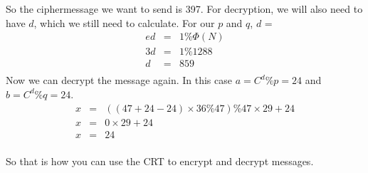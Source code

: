So the ciphermessage we want to send is 397. For decryption, we will also need to have $d$, which we still need to calculate. For our $p$ and $q$, $d$ = 
\[\begin{array}{lcl}
ed &=& 1 \% \Phi(N) \\
3d &=& 1 \% 1288 \\
d &=& 859 \\
\end{array}\]
Now we can decrypt the message again. In this case $a = C^d \% p = 24$ and $b = C^d \% q = 24$.
\[\begin{array}{lcl}
x &=& ((47 + 24 - 24) \times 36 \% 47) \% 47 \times 29 + 24 \\
x &=& 0 \times 29 + 24 \\
x &=& 24\\
\end{array}\]

So that is how you can use the CRT to encrypt and decrypt messages. 


